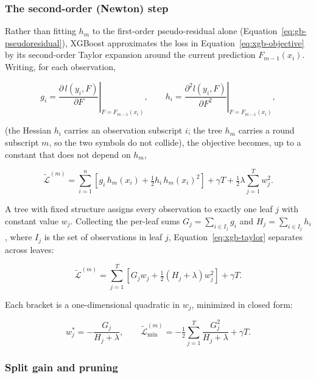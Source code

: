 \subsubsection{The second-order (Newton) step}

Rather than fitting $h_m$ to the first-order pseudo-residual alone
(Equation~\ref{eq:gb-pseudoresidual}), XGBoost approximates the loss in
Equation~\ref{eq:xgb-objective} by its second-order Taylor expansion
around the current prediction $F_{m-1}(x_i)$. Writing, for each
observation,

\begin{equation}
\label{eq:xgb-grad-hess}
g_i = \left.\frac{\partial\, l(y_i, F)}{\partial F}\right|_{F=F_{m-1}(x_i)},
\qquad
h_i = \left.\frac{\partial^2 l(y_i, F)}{\partial F^2}\right|_{F=F_{m-1}(x_i)},
\end{equation}

(the Hessian $h_i$ carries an observation subscript $i$; the tree $h_m$
carries a round subscript $m$, so the two symbols do not collide), the
objective becomes, up to a constant that does not depend on $h_m$,

\begin{equation}
\label{eq:xgb-taylor}
\tilde{\mathcal{L}}^{(m)} =
\sum_{i=1}^{n}\left[ g_i\, h_m(x_i) + \tfrac{1}{2} h_i\, h_m(x_i)^2 \right]
+ \gamma T + \tfrac{1}{2}\lambda \sum_{j=1}^{T} w_j^2 .
\end{equation}

A tree with fixed structure assigns every observation to exactly one leaf
$j$ with constant value $w_j$. Collecting the per-leaf sums
$G_j = \sum_{i \in I_j} g_i$ and $H_j = \sum_{i \in I_j} h_i$, where
$I_j$ is the set of observations in leaf $j$, Equation~\ref{eq:xgb-taylor}
separates across leaves:

\begin{equation}
\label{eq:xgb-per-leaf}
\tilde{\mathcal{L}}^{(m)} =
\sum_{j=1}^{T}\left[ G_j w_j + \tfrac{1}{2}\left(H_j + \lambda\right) w_j^2 \right]
+ \gamma T .
\end{equation}

Each bracket is a one-dimensional quadratic in $w_j$, minimized in closed
form:

\begin{equation}
\label{eq:xgb-leaf-weight}
w_j^{*} = -\frac{G_j}{H_j + \lambda},
\qquad
\tilde{\mathcal{L}}^{(m)}_{\min} =
-\tfrac{1}{2}\sum_{j=1}^{T}\frac{G_j^2}{H_j + \lambda} + \gamma T .
\end{equation}

\subsubsection{Split gain and pruning}

